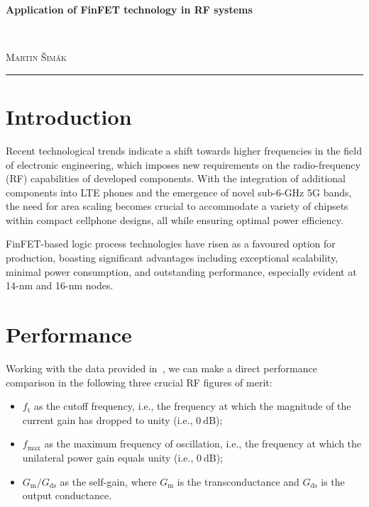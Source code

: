 \documentclass[11pt,a4paper]{article}
\begin{document}

    \begin{center}
        {\LARGE\textbf{Application of FinFET technology in RF systems}}\\[3mm]
        \begin{minipage}{0.4\textwidth}
            \begin{flushleft}
                \textsc{}
            \end{flushleft}
        \end{minipage}
        ~
        \begin{minipage}{0.4\textwidth}
            \begin{flushright}
                \textsc{Martin Šimák}
            \end{flushright}
        \end{minipage} 
        \noindent\rule{14.5cm}{0.4pt}
    \end{center}

    \section{Introduction}

        Recent technological trends indicate a shift towards higher frequencies in the field of electronic engineering, which imposes new requirements on the radio-frequency (RF) capabilities of developed components. With the integration of additional components into LTE phones and the emergence of novel sub-6-GHz 5G bands, the need for area scaling becomes crucial to accommodate a variety of chipsets within compact cellphone designs, all while ensuring optimal power efficiency.
    
        FinFET-based logic process technologies have risen as a favoured option for production, boasting significant advantages including exceptional scalability, minimal power consumption, and outstanding performance, especially evident at 14-nm and 16-nm nodes.


    \section{Performance}

        Working with the data provided in~\cite{singh:14nm-finfet-analog-and-rf-applications}, we can make a direct performance comparison in the following three crucial RF figures of merit:
        \begin{itemize}
            \item $f_{\mathrm{t}}$ as the cutoff frequency, i.e., the frequency at which the magnitude of the current gain has dropped to unity (i.e., $\qty{0}{\dB}$);
            \item $f_{\mathrm{max}}$ as the maximum frequency of oscillation, i.e., the frequency at which the unilateral power gain equals unity (i.e., $\qty{0}{\dB}$);
            \item $G_{\mathrm{m}}/G_{\mathrm{ds}}$ as the self-gain, where $G_{\mathrm{m}}$ is the transconductance and $G_{\mathrm{ds}}$ is the output conductance.
        \end{itemize}
\end{document}
